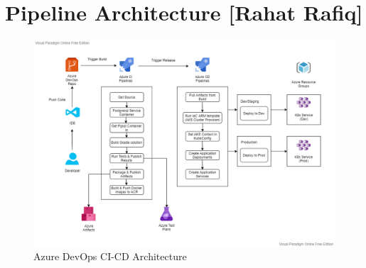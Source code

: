 \section{Pipeline Architecture [Rahat Rafiq]}\label{sec:architecture_sec}

\begin{figure}[h]
    \centering
    \includegraphics[width=15cm]{images/Rahat/Azure CI-CD Pipline Architecture.png}
    \caption{Azure DevOps CI-CD Architecture}
    \label{fig:azure-devops-ci-cd-pipeline-architecture}
\end{figure}

